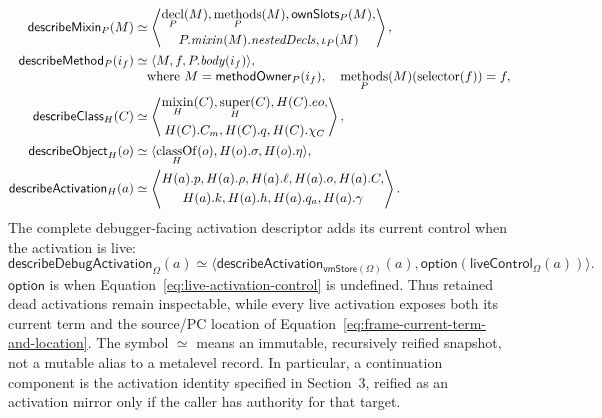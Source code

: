 \begin{equation}\label{eq:reflective-descriptors}
\begin{aligned}
 \mathsf{describeMixin}_{P}(M)&\simeq
   \left\langle\begin{gathered}\mathop{\mathrm{decl}}_P(M),\mathop{\mathrm{methods}}_P(M),
       \mathsf{ownSlots}_P(M),\\
       P.\mathit{mixin}(M).\mathit{nestedDecls},\iota_P(M)
   \end{gathered}\right\rangle,\\
 \mathsf{describeMethod}_{P}(i_f)
   &\simeq\langle M,f,P.\mathit{body}(i_f)\rangle,\\[-1mm]
 &\quad\text{where }M=\mathsf{methodOwner}_P(i_f),\quad
       \mathop{\mathrm{methods}}_P(M)(\mathop{\mathrm{selector}}(f))=f,\\
 \mathsf{describeClass}_{H}(C)&\simeq
   \left\langle\begin{gathered}\mathop{\mathrm{mixin}}_H(C),\mathop{\mathrm{super}}_H(C),H(C).eo,\\
       H(C).C_m,H(C).q,H(C).\chi_C
   \end{gathered}\right\rangle,\\
 \mathsf{describeObject}_{H}(o)
   &\simeq\langle\mathop{\mathrm{classOf}}_H(o),H(o).\sigma,H(o).\eta\rangle,\\
 \mathsf{describeActivation}_{H}(a)&\simeq
   \left\langle\begin{gathered}H(a).p,H(a).\rho,H(a).\ell,H(a).o,H(a).C,\\
       H(a).k,H(a).h,H(a).q_a,H(a).\gamma
   \end{gathered}\right\rangle.
\end{aligned}
\end{equation}
The complete debugger-facing activation descriptor adds its current control
when the activation is live:
\begin{equation}\label{eq:debug-activation-descriptor}
 \mathsf{describeDebugActivation}_{\Omega}(a)
  \simeq\langle
    \mathsf{describeActivation}_{\mathsf{vmStore}(\Omega)}(a),
    \mathsf{option}(\mathsf{liveControl}_{\Omega}(a))\rangle.
\end{equation}
$\mathsf{option}$ is  when
Equation~\eqref{eq:live-activation-control} is undefined.  Thus retained dead
activations remain inspectable, while every live activation exposes both its
current term and the source/PC location of
Equation~\eqref{eq:frame-current-term-and-location}.
The symbol $\simeq$ means an immutable, recursively reified snapshot, not a
mutable alias to a metalevel record.  In particular, a continuation component
is the activation identity specified in Section~3, reified as an activation
mirror only if the caller has authority for that target.

